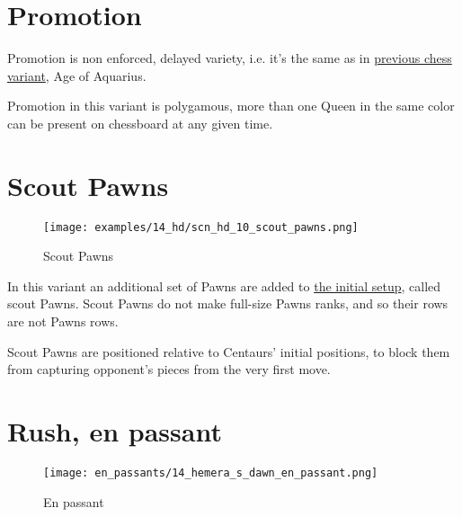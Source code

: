 \section*{Promotion}

Promotion is non enforced, delayed variety, i.e. it's the same as in
\hyperref[sec:Age of Aquarius/Promotion]{previous chess variant}, Age of Aquarius.

Promotion in this variant is polygamous, more than one Queen in the same color
can be present on chessboard at any given time.

\clearpage %

\section*{Scout Pawns}

\vspace*{-1.3\baselineskip}
\noindent
\begin{figure}[!h]
\texttt{[image: examples/14\_hd/scn\_hd\_10\_scout\_pawns.png]}
\caption{Scout Pawns}
\label{fig:scn_hd_10_scout_pawns}
\end{figure}

In this variant an additional set of Pawns are added to \hyperref[fig:14_hemera_s_dawn]{the initial setup},
called scout Pawns. Scout Pawns do not make full-size Pawns ranks, and so their rows are not Pawns rows.

Scout Pawns are positioned relative to Centaurs' initial positions, to block them from capturing opponent's
pieces from the very first move.

\clearpage %

\section*{Rush, en passant}

\vspace*{-1.2\baselineskip}
\noindent
\begin{figure}[!h]
\texttt{[image: en\_passants/14\_hemera\_s\_dawn\_en\_passant.png]}
\caption{En passant}
\label{fig:14_hemera_s_dawn_en_passant}
\end{figure}

